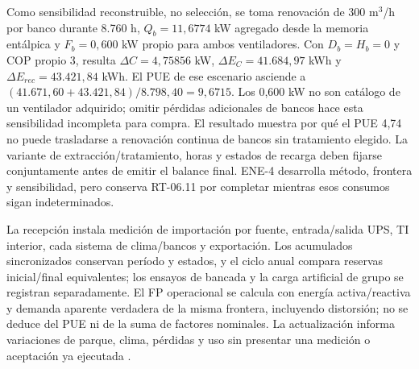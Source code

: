 Como sensibilidad reconstruible, no selección, se toma renovación de 300 m$^3$/h por banco durante 8.760 h, $Q_b=11,6774$ kW agregado desde la memoria entálpica y $F_b=0,600$ kW propio para ambos ventiladores. Con $D_b=H_b=0$ y COP propio 3, resulta $\Delta C=4,75856$ kW, $\Delta E_C=41.684,97$ kWh y $\Delta E_{rec}=43.421,84$ kWh. El PUE de ese escenario asciende a $(41.671,60+43.421,84)/8.798,40=9,6715$. Los 0,600 kW no son catálogo de un ventilador adquirido; omitir pérdidas adicionales de bancos hace esta sensibilidad incompleta para compra. El resultado muestra por qué el PUE 4,74 no puede trasladarse a renovación continua de bancos sin tratamiento elegido. La variante de extracción/tratamiento, horas y estados de recarga deben fijarse conjuntamente antes de emitir el balance final. ENE-4 desarrolla método, frontera y sensibilidad, pero conserva RT-06.11 por completar mientras esos consumos sigan indeterminados.

La recepción instala medición de importación por fuente, entrada/salida UPS, TI interior, cada sistema de clima/bancos y exportación. Los acumulados sincronizados conservan período y estados, y el ciclo anual compara reservas inicial/final equivalentes; los ensayos de bancada y la carga artificial de grupo se registran separadamente. El FP operacional se calcula con energía activa/reactiva y demanda aparente verdadera de la misma frontera, incluyendo distorsión; no se deduce del PUE ni de la suma de factores nominales. La actualización informa variaciones de parque, clima, pérdidas y uso sin presentar una medición o aceptación ya ejecutada \parencite[RT-06.11, p.~15]{pucv-transversal}.
